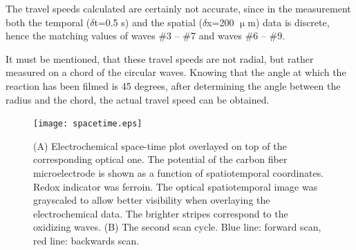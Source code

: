 \documentclass[3p, twocolumn]{elsarticle}
\begin{document}
The travel speeds calculated are certainly not accurate, since in the measurement both the temporal ($\delta$t=0.5 s) and the spatial ($\delta$x=200 $\upmu$m) data is discrete, hence the matching values of waves \#3 -- \#7 and waves \#6 -- \#9.

It must be mentioned, that these travel speeds are not radial, but rather measured on a chord of the circular waves.
Knowing that the angle at which the reaction has been filmed is 45 degrees, after determining the angle between the radius and the chord, the actual travel speed can be obtained.

\def\s{0.5}
\begin{figure}
\centering
{}
\texttt{[image: spacetime.eps]}
\caption{(A) Electrochemical space-time plot overlayed on top of the corresponding optical one.
The potential of the carbon fiber microelectrode is shown as a function of spatiotemporal coordinates.
Redox indicator was ferroin.
The optical spatiotemporal image was grayscaled to allow better visibility when overlaying the electrochemical data.
The brighter stripes correspond to the oxidizing waves.
(B) The second scan cycle.
Blue line: forward scan, red line: backwards scan.
}
\label{fig:spatiotemporal}
\end{figure}
\end{document}
